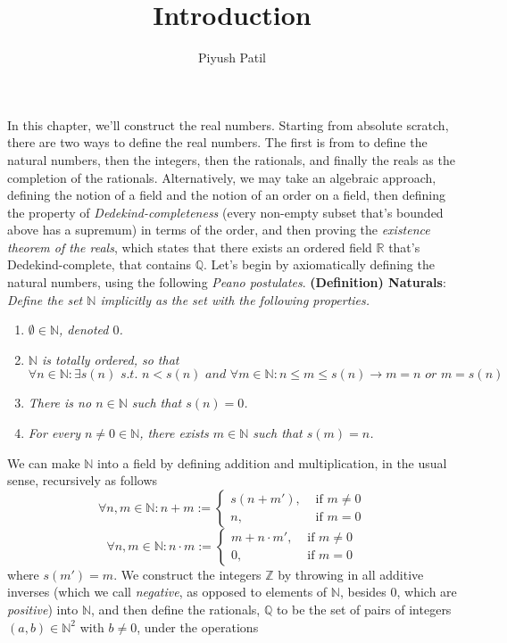 \documentclass{article}
\newcommand*{\tb}{\textbf}
\newcommand*{\ti}{\textit}
\newcommand*{\nn}{\newline \newline}
\newcommand*{\N}{\mathbb{N}}
\newcommand*{\Z}{\mathbb{Z}}
\newcommand*{\Q}{\mathbb{Q}}
\newcommand*{\R}{\mathbb{R}}
\newcommand*{\sti}{\textit{ s.t. }}
\begin{document}
\title{Introduction}
\author{Piyush Patil}
\maketitle

In this chapter, we'll construct the real numbers. Starting from absolute scratch, there are two ways to define the real numbers. The first is from to define the natural numbers, then the integers, then the rationals, and finally the reals as the completion of the rationals. Alternatively, we may take an algebraic approach, defining the notion of a field and the notion of an order on a field, then defining the property of \ti{Dedekind-completeness} (every non-empty subset that's bounded above has a supremum) in terms of the order, and then proving the \ti{existence theorem of the reals}, which states that there exists an ordered field $ \R $ that's Dedekind-complete, that contains $ \Q $.
\nn
Let's begin by axiomatically defining the natural numbers, using the following \ti{Peano postulates}.
\nn
\tb{(Definition) Naturals}: \ti{Define the set $ \N $ implicitly as the set with the following properties.}
\begin{enumerate}
    \item \ti{$ \emptyset \in \N $, denoted $ 0 $.}
    \item \ti{$ \N $ is totally ordered, so that}
        $$ \forall n \in \N: \exists s(n) \sti n < s(n) \ti{ and } \forall m \in \N: n \leq m \leq s(n) \rightarrow m = n \ti{ or } m = s(n) $$
    \item \ti{There is no $ n \in \N $ such that $ s(n) = 0 $.}
    \item \ti{For every $ n \neq 0 \in \N $, there exists $ m \in \N $ such that $ s(m) = n $.}
\end{enumerate}
We can make $ \N $ into a field by defining addition and multiplication, in the usual sense, recursively as follows
    $$ \forall n, m \in \N: n + m := \begin{cases}
        s(n + m'), &\text{ if } m \neq 0 \\
        n, &\text{ if } m = 0 
    \end{cases} $$
    $$ \forall n, m \in \N: n \cdot m := \begin{cases}
        m + n \cdot m', &\text{ if } m \neq 0 \\
        0, &\text{ if } m = 0
    \end{cases} $$
where $ s(m') = m $. We construct the integers $ \Z $ by throwing in all additive inverses (which we call \ti{negative}, as opposed to elements of $ \N $, besides 0, which are \ti{positive}) into $ \N $, and then define the rationals, $ \Q $ to be the set of pairs of integers $ (a, b) \in \N^2 $ with $ b \neq 0 $, under the operations
\end{document}
